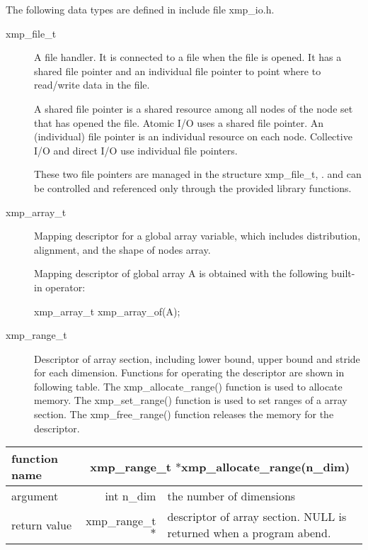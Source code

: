   The following data types are defined in include file xmp\_io.h.
   \begin{description}
    \item[xmp\_file\_t] A file handler.
	       It is connected to a file when the file is opened.
	       It has a shared file pointer and an individual file pointer
	       to point where to read/write data in the file.

	       A shared file pointer is a shared resource among all nodes of the node set
             that has opened the file. Atomic I/O uses a shared file pointer.
	       An (individual) file pointer is an individual resource on each node. 
	       Collective I/O and direct I/O use individual file pointers.
	       
	       These two file pointers are managed in the structure xmp\_file\_t, .
	       and can be controlled and referenced only through
	       the provided library functions.
    \item[xmp\_array\_t] Mapping descriptor for a global array variable,
	       which includes distribution, alignment, and the shape of nodes array.

	       Mapping descriptor of global array A is obtained with
	       the following built-in operator:
	       
	       xmp\_array\_t xmp\_array\_of(A);
\fi

\item[xmp\_range\_t] Descriptor of array section, including
      lower bound, upper bound and stride for each dimension.
      Functions for operating the descriptor are shown in following table.
      The xmp\_allocate\_range() function is used to allocate memory.
      The xmp\_set\_range() function is used to set ranges of a array section.
      The xmp\_free\_range() function releases the memory for the descriptor.
   \end{description}

   \begin{table}[h]
    \begin{center}
      \begin{tabular}{|l|r|p{90mm}|}
      \hline
      {\bf function name}  & \multicolumn{2}{c|}{\bf xmp\_range\_t $*$xmp\_allocate\_range(n\_dim)}  \\ \hline \hline
      argument & int n\_dim & the number of dimensions \\ \hline
      return value & xmp\_range\_t$*$ & descriptor of array section. NULL is returned
	      when a program abend. \\ \hline
      \end{tabular}
     \end{center}
    \label{tb:aaa}
   \end{table}

